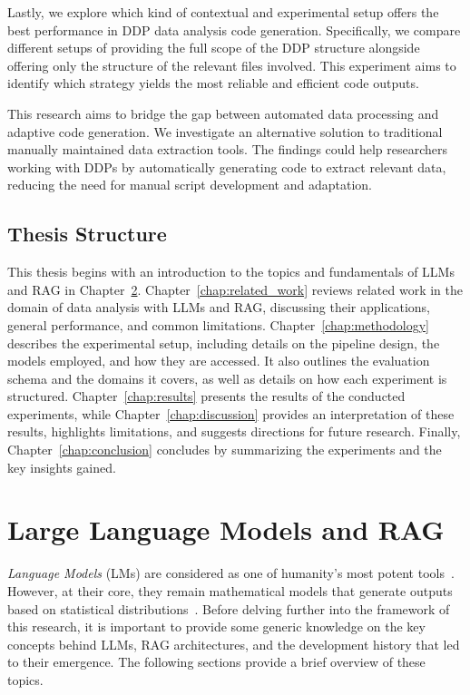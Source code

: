 \documentclass{DESSThesis}
\begin{document}
Lastly, we explore which kind of contextual and experimental setup offers the best performance in DDP data analysis code generation. Specifically, we compare different setups of providing the full scope of the DDP structure alongside offering only the structure of the relevant files involved. This experiment aims to identify which strategy yields the most reliable and efficient code outputs.

This research aims to bridge the gap between automated data processing and adaptive code generation. We investigate an alternative solution to traditional manually maintained data extraction tools. The findings could help researchers working with DDPs by automatically generating code to extract relevant data, reducing the need for manual script development and adaptation.

\section{Thesis Structure}

This thesis begins with an introduction to the topics and fundamentals of LLMs and RAG in Chapter~\ref{chap:LLM_and_RAG}. Chapter~\ref{chap:related_work} reviews related work in the domain of data analysis with LLMs and RAG, discussing their applications, general performance, and common limitations. Chapter~\ref{chap:methodology} describes the experimental setup, including details on the pipeline design, the models employed, and how they are accessed. It also outlines the evaluation schema and the domains it covers, as well as details on how each experiment is structured. Chapter~\ref{chap:results} presents the results of the conducted experiments, while Chapter~\ref{chap:discussion} provides an interpretation of these results, highlights limitations, and suggests directions for future research. Finally, Chapter~\ref{chap:conclusion} concludes by summarizing the experiments and the key insights gained.

\chapter{Large Language Models and RAG} \label{chap:LLM_and_RAG}

\emph{Language Models} (LMs) are considered as one of humanity's most potent tools~\cite{wang2024historydevelopmentprincipleslarge}. However, at their core, they remain mathematical models that generate outputs based on statistical distributions~\cite{10.1145/3624724}. Before delving further into the framework of this research, it is important to provide some generic knowledge on the key concepts behind LLMs, RAG architectures, and the development history that led to their emergence. The following sections provide a brief overview of these topics.
\end{document}
